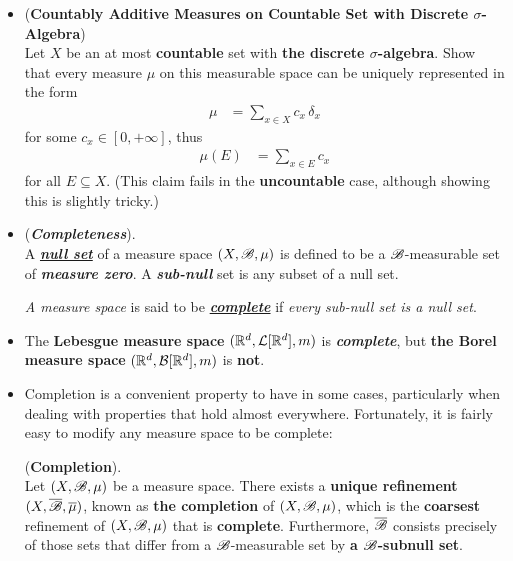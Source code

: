 \documentclass[11pt]{article}
\begin{document}
\begin{itemize}
\item \begin{exercise}  (\textbf{Countably Additive Measures on Countable Set with Discrete $\sigma$-Algebra})\\
Let $X$ be an at most \textbf{countable} set with \textbf{the discrete $\sigma$-algebra}. Show that every measure $\mu$ on this measurable space can be uniquely represented in the form
\begin{align*}
\mu &= \sum_{x \in X}c_x \, \delta_x
\end{align*} for some $c_x \in [0, +\infty]$, thus
\begin{align*}
\mu(E) &= \sum_{x \in E}c_x
\end{align*} for all $E \subseteq X$. (This claim fails in the \textbf{uncountable} case, although showing this is slightly tricky.)
\end{exercise}

\item \begin{definition}(\emph{\textbf{Completeness}}). \citep{tao2011introduction} \\
A \underline{\emph{\textbf{null set}}} of a measure space $(X, {\mathscr B}, \mu)$ is defined to be a ${\mathscr B}$-measurable set of \emph{\textbf{measure zero}}. A \emph{\textbf{sub-null}} set is any subset of a null set. 

\emph{A measure space} is said to be \underline{\emph{\textbf{complete}}} if \emph{every sub-null set is a null set}.
\end{definition}

\item \begin{theorem}
The \textbf{Lebesgue measure space} $({\mathbb R}^d, {\mathcal L}[{\mathbb R}^d], m)$ is \emph{\textbf{complete}}, but \textbf{the Borel measure space} $({\mathbb R}^d, {\mathcal B}[{\mathbb R}^d], m)$ is \textbf{not}.
\end{theorem}

\item Completion is a convenient property to have in some cases, particularly when dealing with properties that hold almost everywhere.
Fortunately, it is fairly easy to modify any measure space to be complete:

\begin{proposition} (\textbf{Completion}).\\
 Let $(X, {\mathscr B}, \mu)$  be a measure space. There exists a \textbf{unique refinement} $(X, \overline{{\mathscr B}}, \overline{\mu})$, known as \textbf{the completion} of $(X, {\mathscr B}, \mu)$, which is the \textbf{coarsest} refinement of  $(X, {\mathscr B}, \mu)$ that is \textbf{complete}. Furthermore, $\overline{{\mathscr B}}$ consists precisely of those sets that differ from a ${\mathscr B}$-measurable set by \textbf{a ${\mathscr B}$-subnull set}.
\end{proposition}


\end{itemize}
\end{document}
